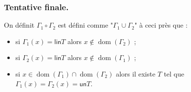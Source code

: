 \documentclass[./main]{subfiles}
\begin{document}
  \subsubsection{Tentative finale.}

  \begin{defn}
    On définit $\Gamma_1 \circ \Gamma_2$ est défini comme "$\Gamma_1 \cup \Gamma_2$" à ceci près que :
    \begin{itemize}
      \item si $\Gamma_1(x) = \mathsf{lin} T$ alors $x \not\in \operatorname{dom}(\Gamma_2)$ ;
      \item si $\Gamma_2(x) = \mathsf{lin} T$ alors $x \not\in \operatorname{dom}(\Gamma_1)$ ;
      \item si $x \in \operatorname{dom}(\Gamma_1) \cap \operatorname{dom}(\Gamma_2)$ alors il existe $T$ tel que $\Gamma_1(x) = \Gamma_2(x) = \mathsf{un} T$.
    \end{itemize}
  \end{defn}
\end{document}
